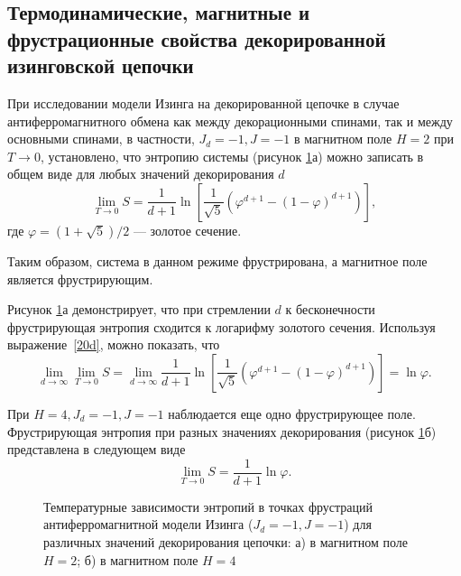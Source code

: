 \subsection{Термодинамические, магнитные и фрустрационные свойства декорированной изинговской цепочки}

При исследовании модели Изинга на декорированной цепочке в случае антиферромагнитного обмена как между декорационными спинами, так и между основными спинами, в частности, \mbox{$J_d=-1, J=-1$} в магнитном поле $H=2$ при $T\rightarrow 0$, установлено, что энтропию системы (рисунок \ref{entropyDecor}а) можно записать в общем виде для любых значений декорирования $d$
\begin{equation}
\lim_{T \rightarrow 0} S = \frac{1}{d+1} \ln \left[\frac{1}{\sqrt{5}}\left(\varphi^{d+1}-(1-\varphi)^{d+1}\right)\right],
\label{20d}
\end{equation}
где $\varphi=(1+\sqrt{5})/2$ --- золотое сечение.

Таким образом, система в данном режиме фрустрирована, а магнитное поле является фрустрирующим.

Рисунок \ref{entropyDecor}а демонстрирует, что при стремлении $d$ к бесконечности фрустрирующая энтропия сходится к логарифму золотого сечения. Используя выражение~\eqref{20d}, можно показать, что
\begin{equation}
\lim_{d\rightarrow \infty} \lim_{T \rightarrow 0} S = \lim_{d\rightarrow \infty} \frac{1}{d+1} \ln \left[\frac{1}{\sqrt{5}}\left(\varphi^{d+1}-(1-\varphi)^{d+1}\right)\right] = \ln \varphi.
\label{21d}
\end{equation}

При \mbox{$H=4, J_d=-1, J=-1$} наблюдается еще одно фрустрирующее поле. Фрустрирующая энтропия при разных значениях декорирования (рисунок \ref{entropyDecor}б) представлена в следующем виде
\begin{equation}
\lim_{T \rightarrow 0} S = \frac{1}{d+1} \ln \varphi.
\label{22d}
\end{equation}

 \begin{figure}[h]
 	\begin{minipage}{0.49\linewidth}
 	\end{minipage}
 	\hfill
 	\begin{minipage}{0.49\linewidth}
 	\end{minipage}
 	\caption{Температурные зависимости энтропий в точках фрустраций антиферромагнитной модели Изинга ($J_d=-1, J=-1$) для различных значений декорирования цепочки: а) в магнитном поле $H=2$;  б) в магнитном поле $H=4$}
 	\label{entropyDecor}
 \end{figure}

